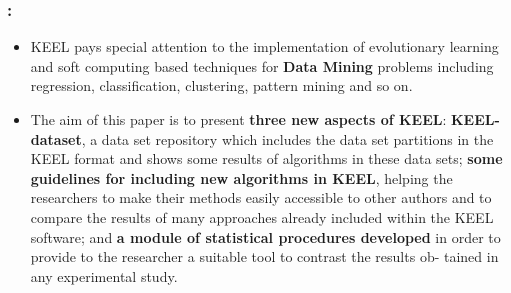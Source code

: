 \documentclass{beamer}
\begin{document}
\begin{CJK*}{UTF8}{bsmi}

\begin{frame}
	\frametitle{\insertsection : \insertsubsection}
	
	\begin{itemize}
		\item KEEL pays special attention to the implementation of evolutionary learning and soft computing based techniques for \textbf{Data Mining} problems including regression, classification, clustering, pattern mining and so on.
		
		\item The aim of this paper is to present \textbf{three new aspects of KEEL}: \textbf{KEEL-dataset}, a data set repository which includes the data set partitions in the KEEL format and shows some results of algorithms in these data sets;\textbf{ some guidelines for including new algorithms in KEEL}, helping the researchers to make their methods easily accessible to other authors and to compare the results of many approaches already included within the KEEL software; and \textbf{a module of statistical procedures developed} in order to provide to the researcher a suitable tool to contrast the results ob- tained in any experimental study.
		
	\end{itemize}
	
\end{frame}




\end{CJK*}
\end{document}
